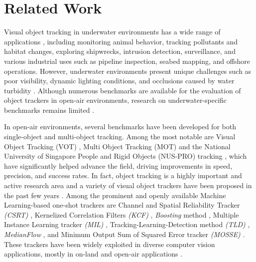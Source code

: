 \section{Related Work}
\label{related}
Visual object tracking in underwater environments has a wide range of applications \cite{6263248, 9904898}, including monitoring animal behavior, tracking pollutants and habitat changes, exploring shipwrecks, intrusion detection, surveillance, and various industrial uses such as pipeline inspection, seabed mapping, and offshore operations. However, underwater environments present unique challenges such as poor visibility, dynamic lighting conditions, and occlusions caused by water turbidity \cite{fabbri2018underwater}. Although numerous benchmarks are available for the evaluation of object trackers in open-air environments, research on underwater-specific benchmarks remains limited \cite{9032954,Panetta:IJOE:2022, Alawode_2022_ACCV}.

In open-air environments, several benchmarks have been developed for both single-object and multi-object tracking. Among the most notable are Visual Object Tracking (VOT) \cite{kristan2015vot}, Multi Object Tracking (MOT) \cite{leal2015motchallenge} and the National University of Singapore People and Rigid Objects (NUS-PRO) tracking \cite{Li2015NUSPRO}, which have significantly helped advance the field, driving improvements in speed, precision, and success rates. In fact, object tracking is a highly important and active research area and a variety of visual object trackers have been proposed in the past few years \cite{chen2022visual}. Among the prominent and openly available Machine Learning-based one-shot trackers are Channel and Spatial Reliability Tracker \textit{(CSRT)} \cite{Lukezic2017}, Kernelized Correlation Filters \textit{(KCF)} \cite{henriques2014high}, \textit{Boosting} method \cite{Grabner2006}, Multiple Instance Learning tracker \textit{(MIL)} \cite{5206737}, Tracking-Learning-Detection method \textit{(TLD)} \cite{kalal2011tracking}, \textit{MedianFlow} \cite{5596017}, and Minimum Output Sum of Squared Error tracker \textit{(MOSSE)} \cite{5539960}. These trackers have been widely exploited in diverse computer vision applications, mostly in on-land and open-air applications \cite{dardagan2021multiple}.%

